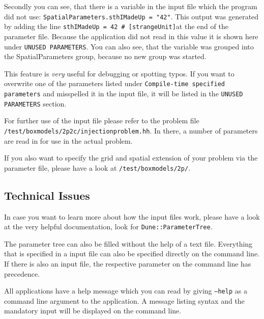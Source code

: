 Secondly you can see, that there is a variable in the input  file which the program did not use:
  \newline
  \texttt{SpatialParameters.sthIMadeUp = "42"}.
  \newline 
  This output was generated by adding the line \newline  \verb+sthIMadeUp = 42 # [strangeUnit]+\newline  at the end of the parameter file. Because the application did not read in this value it is shown here under \texttt{UNUSED PARAMETERS}. You can also see, that the variable was grouped into the SpatialParameters group, because no new group was started. 
  
  This feature is \emph{very} useful for debugging or spotting typos. If you want to overwrite one of the parameters listed under \texttt{Compile-time specified parameters} and misspelled it in the input file, it will be listed in the  \texttt{UNUSED PARAMETERS} section. 
  
  For further use of the input file please refer to the problem file 
  \newline 
  \texttt{/test/boxmodels/2p2c/injectionproblem.hh}.
  \newline
  In there, a number of parameters are read in for use in the actual problem. 

  If you also want to specify  the grid and spatial extension of your problem via the parameter file, please have a look at 
    \newline 
  \texttt{/test/boxmodels/2p/}.
  
  \subsection{Technical Issues}
  In case you want to learn more about how the input files work, please have a look at the very helpful \Dune documentation, look for \texttt{Dune::ParameterTree}.
  
The parameter tree can also be filled without the help of a text file. Everything that is specified in a \Dumux input file can also be specified directly on the command line. If there is also an input file, the respective parameter on the command line has precedence. 

All applications have a help message which you can read by giving \texttt{--help}   as a command line argument to the application. A message listing syntax and the mandatory input will be displayed on the command line. 
  
  
